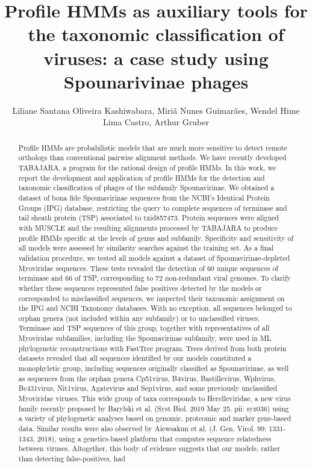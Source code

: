 \documentclass[twoside]{article}
\title{\vspace{-15mm}\fontsize{24pt}{10pt}\selectfont\textbf{ Profile HMMs as auxiliary tools for the taxonomic classification of viruses: a case study using Spounarivinae phages }} %
\author{ Liliane Santana Oliveira Kashiwabara, Miri\~a Nunes Guimar\~aes, Wendel Hime Lima Castro, Arthur Gruber }
\affil{ USP }
\date{}
\begin{document}
  
  
  \maketitle %
  
  
  \thispagestyle{fancy} %
  
  
  \begin{abstract}
  Profile HMMs are probabilistic models that are much more sensitive to detect remote orthologs than conventional pairwise alignment methods. We have recently developed TABAJARA,  a program for the rational design of profile HMMs. In this work,  we report the development and application of profile HMMs for the detection and taxonomic classification of phages of the subfamily Spounavirinae. We obtained a dataset of bona fide Spounavirinae sequences from the NCBI’s Identical Protein Groups (IPG) database,  restricting the query to complete sequences of terminase and tail sheath protein (TSP) associated to txid857473. Protein sequences were aligned with MUSCLE and the resulting alignments processed by TABAJARA to produce profile HMMs specific at the levels of genus and subfamily. Specificity and sensitivity of all models were assessed by similarity searches against the training set. As a final validation procedure,  we tested all models against a dataset of Spounavirinae-depleted Myoviridae sequences. These tests revealed the detection of 60 unique sequences of terminase and 66 of TSP,  corresponding to 72 non-redundant viral genomes. To clarify whether these sequences represented false positives detected by the models or corresponded to misclassified sequences,  we inspected their taxonomic assignment on the IPG and NCBI Taxonomy databases. With no exception,  all sequences belonged to orphan genera (not included within any subfamily) or to unclassified viruses. Terminase and TSP sequences of this group,  together with representatives of all Myoviridae subfamilies,  including the Spounavirinae subfamily,  were used in ML phylogenetic reconstructions with FastTree program. Trees derived from both protein datasets revealed that all sequences identified by our models constituted a monophyletic group,  including sequences originally classified as Spounavirinae,  as well as sequences from the orphan genera Cp51virus,  B4virus,  Bastillevirus,  Wphvirus,  Bc431virus,  Nit1virus,  Agatevirus and Sep1virus,  and some previously unclassified Myoviridae viruses. This wide group of taxa corresponds to Herelleviridae,  a new virus family recently proposed by Barylski et al. (Syst Biol. 2019 May 25. pii: syz036) using a variety of phylogenetic analyses based on genomic,  proteomic and marker gene-based data. Similar results were also observed by Aiewsakun et al. (J. Gen. Virol. 99: 1331-1343,  2018),  using a genetics-based platform that computes sequence relatedness between viruses. Altogether,  this body of evidence suggests that our models,  rather than detecting false-positives,  had 
\end{abstract}
\end{document}
